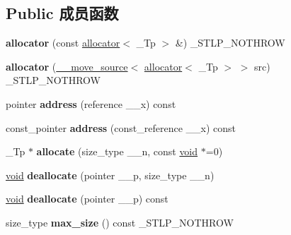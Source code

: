 \subsection*{Public 成员函数}
\begin{DoxyCompactItemize}
\item 
\mbox{\label{classallocator_a91c54a62acd3cbb66682ba03541e6227}} 
{\bfseries allocator} (const \hyperlink{classallocator}{allocator}$<$ \+\_\+\+Tp $>$ \&) \+\_\+\+S\+T\+L\+P\+\_\+\+N\+O\+T\+H\+R\+OW
\item 
\mbox{\label{classallocator_a9f7cbab187419c7634ffffde76759b3d}} 
{\bfseries allocator} (\hyperlink{class____move__source}{\+\_\+\+\_\+move\+\_\+source}$<$ \hyperlink{classallocator}{allocator}$<$ \+\_\+\+Tp $>$ $>$ src) \+\_\+\+S\+T\+L\+P\+\_\+\+N\+O\+T\+H\+R\+OW
\item 
\mbox{\label{classallocator_ac556f85e370c114f297632bd18b738f5}} 
pointer {\bfseries address} (reference \+\_\+\+\_\+x) const
\item 
\mbox{\label{classallocator_a0282b673478c70ef8e4b6403fc676f83}} 
const\+\_\+pointer {\bfseries address} (const\+\_\+reference \+\_\+\+\_\+x) const
\item 
\mbox{\label{classallocator_abe1b868d52e0de2713fe559a0003631e}} 
\+\_\+\+Tp $\ast$ {\bfseries allocate} (size\+\_\+type \+\_\+\+\_\+n, const \hyperlink{interfacevoid}{void} $\ast$=0)
\item 
\mbox{\label{classallocator_a00bfd25b0cf4a225a658344f7ef32a1a}} 
\hyperlink{interfacevoid}{void} {\bfseries deallocate} (pointer \+\_\+\+\_\+p, size\+\_\+type \+\_\+\+\_\+n)
\item 
\mbox{\label{classallocator_a13856f4e8c3ebca357d3f5c7afe7d0f8}} 
\hyperlink{interfacevoid}{void} {\bfseries deallocate} (pointer \+\_\+\+\_\+p) const
\item 
\mbox{\label{classallocator_a22640776dba1b7bc8a0815f00924256c}} 
size\+\_\+type {\bfseries max\+\_\+size} () const \+\_\+\+S\+T\+L\+P\+\_\+\+N\+O\+T\+H\+R\+OW
\item 
\mbox{\label{classallocator_a7d25acd3512d010a008ce2a8ad883e4c}} 

\end{DoxyCompactItemize}
